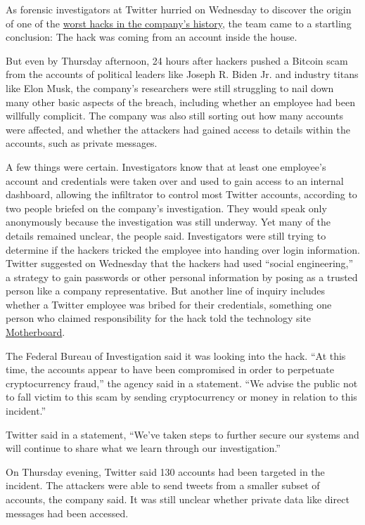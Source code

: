 As forensic investigators at Twitter hurried on Wednesday to discover
the origin of one of the
\href{https://www.nytimes3xbfgragh.onion/2020/07/17/technology/twitter-hackers-interview.html}{worst
hacks in the company's history}, the team came to a startling
conclusion: The hack was coming from an account inside the house.

But even by Thursday afternoon, 24 hours after hackers pushed a Bitcoin
scam from the accounts of political leaders like Joseph R. Biden Jr. and
industry titans like Elon Musk, the company's researchers were still
struggling to nail down many other basic aspects of the breach,
including whether an employee had been willfully complicit. The company
was also still sorting out how many accounts were affected, and whether
the attackers had gained access to details within the accounts, such as
private messages.

A few things were certain. Investigators know that at least one
employee's account and credentials were taken over and used to gain
access to an internal dashboard, allowing the infiltrator to control
most Twitter accounts, according to two people briefed on the company's
investigation. They would speak only anonymously because the
investigation was still underway. Yet many of the details remained
unclear, the people said. Investigators were still trying to determine
if the hackers tricked the employee into handing over login information.
Twitter suggested on Wednesday that the hackers had used ``social
engineering,'' a strategy to gain passwords or other personal
information by posing as a trusted person like a company representative.
But another line of inquiry includes whether a Twitter employee was
bribed for their credentials, something one person who claimed
responsibility for the hack told the technology site
\href{https://www.vice.com/en_us/article/jgxd3d/twitter-insider-access-panel-account-hacks-biden-uber-bezos}{Motherboard}.

The Federal Bureau of Investigation said it was looking into the hack.
``At this time, the accounts appear to have been compromised in order to
perpetuate cryptocurrency fraud,'' the agency said in a statement. ``We
advise the public not to fall victim to this scam by sending
cryptocurrency or money in relation to this incident.''

Twitter said in a statement, ``We've taken steps to further secure our
systems and will continue to share what we learn through our
investigation.''

On Thursday evening, Twitter said 130 accounts had been targeted in the
incident. The attackers were able to send tweets from a smaller subset
of accounts, the company said. It was still unclear whether private data
like direct messages had been accessed.

